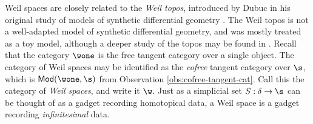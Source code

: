 Weil spaces are closely related to the \emph{Weil topos}, introduced by Dubuc in his original study of models of synthetic differential geometry \cite{Dubuc1981}. The Weil topos is not a well-adapted model of synthetic differential geometry, and was mostly treated as a toy model, although a deeper study of the topos may be found in \cite{Bertram2014}. Recall that the category $\wone$ is the free tangent category over a single object. The category of Weil spaces may be identified as the \emph{cofree} tangent category over $\s$, which is $\mathsf{Mod}(\wone, \s)$ from Observation \ref{obs:cofree-tangent-cat}. Call this the category of \emph{Weil spaces}, and write it $\w$. Just as a simplicial set $S: \delta \to \s$ can be thought of as a gadget recording homotopical data, a Weil space is a gadget recording \emph{infinitesimal} data.

